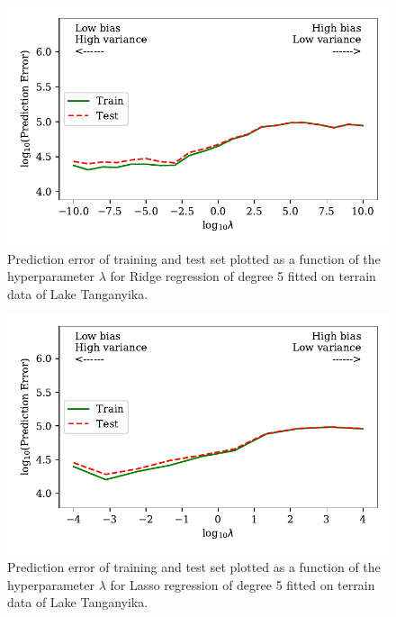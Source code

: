 \documentclass[a4paper, 10pt]{article}
\begin{document}
\begin{figure}[H]
    \includegraphics{figs/biasvariancetradeoff_Ridge_terrain.pdf}
    \caption{Prediction error of training and test set plotted as a function of the hyperparameter $\lambda$ for Ridge regression of degree 5 fitted on terrain data of Lake Tanganyika.}
    \label{fig:bias_ridge_terrain}
\end{figure}

\begin{figure}[H]
    \includegraphics{figs/biasvariancetradeoff_LASSO_terrain.pdf}
    \caption{Prediction error of training and test set plotted as a function of the hyperparameter $\lambda$ for Lasso regression of degree 5 fitted on terrain data of Lake Tanganyika.}
    \label{fig:bias_lasso_terrain}
\end{figure}
\end{document}
